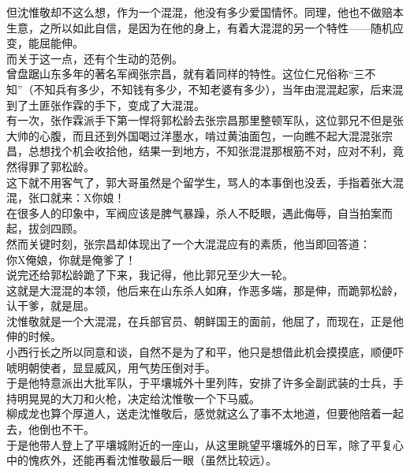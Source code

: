\begin{multicols}{\theparacolNo}
但沈惟敬却不这么想，作为一个混混，他没有多少爱国情怀。同理，他也不做赔本生意，之所以如此自信，是因为在他的身上，有着大混混的另一个特性——随机应变，能屈能伸。\\

而关于这一点，还有个生动的范例。\\

曾盘踞山东多年的著名军阀张宗昌，就有着同样的特性。这位仁兄俗称“三不知”（不知兵有多少，不知钱有多少，不知老婆有多少），当年由混混起家，后来混到了土匪张作霖的手下，变成了大混混。\\

有一次，张作霖派手下第一悍将郭松龄去张宗昌那里整顿军队，这位郭兄不但是张大帅的心腹，而且还到外国喝过洋墨水，啃过黄油面包，一向瞧不起大混混张宗昌，总想找个机会收拾他，结果一到地方，不知张混混那根筋不对，应对不利，竟然得罪了郭松龄。\\

这下就不用客气了，郭大哥虽然是个留学生，骂人的本事倒也没丢，手指着张大混混，张口就来：X你娘！\\

在很多人的印象中，军阀应该是脾气暴躁，杀人不眨眼，遇此侮辱，自当拍案而起，拔剑四顾。\\

然而关键时刻，张宗昌却体现出了一个大混混应有的素质，他当即回答道：\\

你X俺娘，你就是俺爹了！\\

说完还给郭松龄跪了下来，我记得，他比郭兄至少大一轮。\\

这就是大混混的本领，他后来在山东杀人如麻，作恶多端，那是伸，而跪郭松龄，认干爹，就是屈。\\

沈惟敬就是一个大混混，在兵部官员、朝鲜国王的面前，他屈了，而现在，正是他伸的时候。\\

小西行长之所以同意和谈，自然不是为了和平，他只是想借此机会摸摸底，顺便吓唬明朝使者，显显威风，用气势压倒对手。\\

于是他特意派出大批军队，于平壤城外十里列阵，安排了许多全副武装的士兵，手持明晃晃的大刀和火枪，决定给沈惟敬一个下马威。\\

柳成龙也算个厚道人，送走沈惟敬后，感觉就这么了事不太地道，但要他陪着一起去，他倒也不干。\\

于是他带人登上了平壤城附近的一座山，从这里眺望平壤城外的日军，除了平复心中的愧疚外，还能再看沈惟敬最后一眼（虽然比较远）。\\


\end{multicols}
